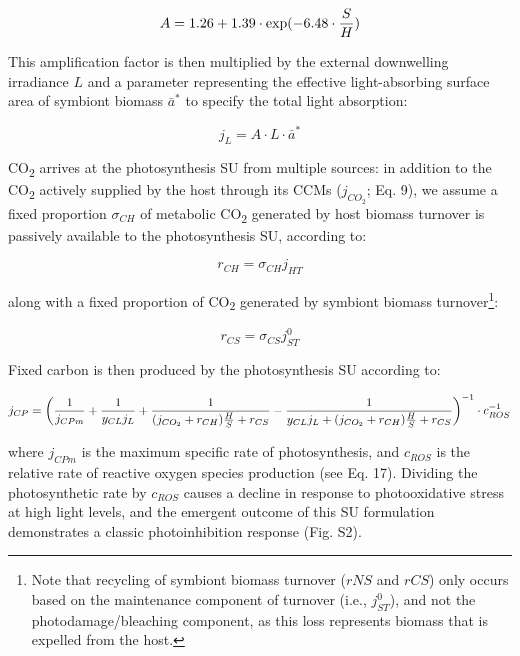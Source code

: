 \documentclass[]{elsarticle} %
\begin{document}
\begin{equation} A = 1.26 + 1.39 \cdot \exp(-6.48 \cdot {S \over H}) \end{equation}

This amplification factor is then multiplied by the external downwelling
irradiance \(L\) and a parameter representing the effective
light-absorbing surface area of symbiont biomass \(\bar{a}^*\) to
specify the total light absorption:

\begin{equation} j_L =  A \cdot L \cdot \bar{a}^* \end{equation}

CO\textsubscript{2} arrives at the photosynthesis SU from multiple
sources: in addition to the CO\textsubscript{2} actively supplied by the
host through its CCMs (\(j_{CO_2}\); Eq. 9), we assume a fixed
proportion \(\sigma_{CH}\) of metabolic CO\textsubscript{2} generated by
host biomass turnover is passively available to the photosynthesis SU,
according to:

\begin{equation} r_{CH}=\sigma_{CH}j_{HT} \end{equation}

along with a fixed proportion of CO\textsubscript{2} generated by
symbiont biomass turnover\footnote{Note that recycling of symbiont
  biomass turnover (\(rNS\) and \(rCS\)) only occurs based on the
  maintenance component of turnover (i.e., \(j_{ST}^0\)), and not the
  photodamage/bleaching component, as this loss represents biomass that
  is expelled from the host.}:

\begin{equation} r_{CS}=\sigma_{CS}j_{ST}^0 \end{equation}

Fixed carbon is then produced by the photosynthesis SU according to:

\begin{equation} j_{CP} = \bigg({1 \over j_{CPm}} + {1 \over {y_{CL} j_L }} + {1 \over {(j_{CO_2} + r_{CH}){H \over S} + r_{CS}}} - {1 \over {y_{CL} j_L + (j_{CO_2} + r_{CH}){H \over S} + r_{CS}}}\bigg)^{-1} \cdot c_{ROS}^{-1} \end{equation}

where \(j_{CPm}\) is the maximum specific rate of photosynthesis, and
\(c_{ROS}\) is the relative rate of reactive oxygen species production
(see Eq. 17). Dividing the photosynthetic rate by \(c_{ROS}\) causes a
decline in response to photooxidative stress at high light levels, and
the emergent outcome of this SU formulation demonstrates a classic
photoinhibition response (Fig. S2).
\end{document}
